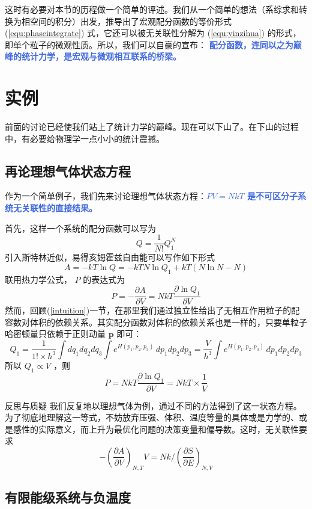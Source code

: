 这时有必要对本节的历程做一个简单的评述。我们从一个简单的想法（系综求和转换为相空间的积分）出发，推导出了宏观配分函数的等价形式 (\ref*{equ:phaseintegrate}) 式，它还可以被无关联性分解为 (\ref*{equ:yinzihua}) 的形式，即单个粒子的微观性质。所以，我们可以自豪的宣布： \textcolor{RoyalBlue}{\textbf{\kaishu 配分函数，连同以之为巅峰的统计力学，是宏观与微观相互联系的桥梁。}}

\section{实例}

前面的讨论已经使我们站上了统计力学的巅峰。现在可以下山了。在下山的过程中，有必要给物理学一点小小的统计震撼。

\subsection{再论理想气体状态方程}

作为一个简单例子，我们先来讨论理想气体状态方程：\textcolor{RoyalBlue}{\textbf{\kaishu $PV = NkT$ 是不可区分子系统无关联性的直接结果。}}

首先，这样一个系统的配分函数可以写为
\[
    Q = \frac{1}{N!} Q_1^N
\]
引入斯特林近似，易得亥姆霍兹自由能可以写作如下形式
\[
    A = -kT\ln Q = -kT N \ln Q_1 + kT(N\ln N - N)
\]
联用热力学公式， $P$ 的表达式为
\[
    P = - \frac{\partial A}{\partial V} = NkT \frac{\partial \ln Q_1}{\partial V}
\]
然而，回顾(\ref*{intuition})一节，在那里我们通过独立性给出了无相互作用粒子的配容数对体积的依赖关系。其实配分函数对体积的依赖关系也是一样的，只要单粒子哈密顿量只依赖于正则动量 $\bm{p}$ 即可：
\[
    Q_1 = \frac{1}{1!\times h^3}\int dq_1dq_2dq_3\int e^{H(p_1,p_2,p_3)}\,dp_1dp_2dp_3  = \frac{V}{h^3} \int e^{H(p_1,p_2,p_3)}\,dp_1dp_2dp_3
\]
所以 $Q_1 \propto V$ ，则
\[
    P = NkT \frac{\partial \ln Q_1}{\partial V} = NkT \times \frac{1}{V} 
\]
\begin{justification}{\kaishu 反思与质疑}
\kaishu \fontsize{11pt}{16pt}
    \quad\quad 我们反复地以理想气体为例，通过不同的方法得到了这一状态方程。为了彻底地理解这一等式，不妨放弃压强、体积、温度等量的具体或是力学的、或是感性的实际意义，而上升为最优化问题的决策变量和偏导数。这时，无关联性要求
    \[
        -\left(\frac{\partial A}{\partial V}\right)_{N,T} V = Nk \bigg/ \left(\frac{\partial S}{\partial E} \right)_{N,V}
    \]
\end{justification}

\subsection{有限能级系统与负温度}

